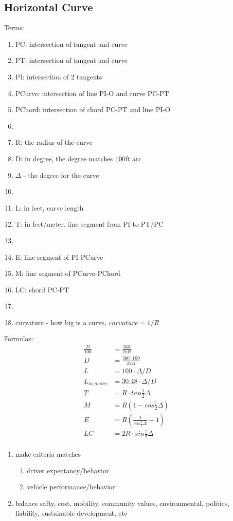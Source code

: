 \documentclass{article}
\begin{document}
  \subsection{Horizontal Curve}
  Terms:
  \begin{enumerate}
    \item PC: intersection of tangent and curve
    \item PT: intersection of tangent and curve
    \item PI: intersection of 2 tangents
    \item PCurve: intersection of line PI-O and curve PC-PT
    \item PChord: intersection of chord PC-PT and line PI-O
    \item 
    \item R: the radius of the curve
    \item D: in degree, the degree matches 100ft arc
    \item $\Delta$ - the degree for the curve
    \item 
    \item L: in feet, curve length 
    \item T: in feet/meter, line segment from PI to PT/PC
    \item 
    \item E: line segment of PI-PCurve
    \item M: line segment of PCurve-PChord 
    \item LC: chord PC-PT 
    \item 
    \item curvature - how big is a curve, $curvature = 1/R$
  \end{enumerate}
  Formulas:
  \begin{align*}
     \frac{D}{100} & = \frac{360}{2\pi R} \\
     D & = \frac{360 \cdot 100}{2\pi R} \\
     L & = 100 \cdot \Delta / D \\
     L_{in\_meter} & = 30.48 \cdot \Delta / D \\
     T & = R \cdot tan \frac{1}{2}\Delta \\
     M & = R(1-cos \frac{1}{2} \Delta) \\
     E & = R(\frac{1}{cos \frac{1}{2} \Delta} - 1) \\
     LC & = 2R \cdot sin \frac{1}{2} \Delta \\
  \end{align*}

  \begin{enumerate}
    \item make criteria matches  
    \begin{enumerate}
      \item driver expectancy/behavior
      \item vehicle performance/behavior
    \end{enumerate}
    \item balance safty, cost, mobility, community values, environmental, politics, liability, sustainable development, etc
  \end{enumerate}
\end{document}
